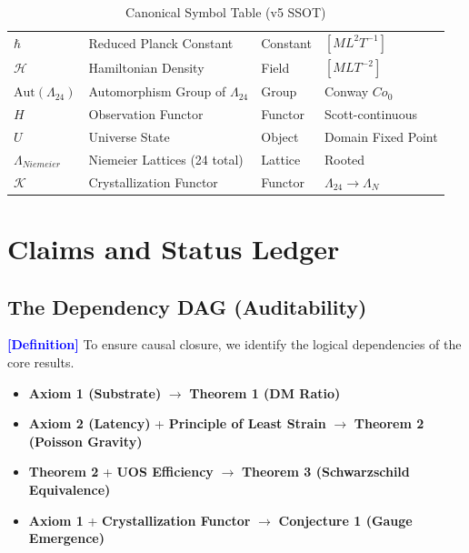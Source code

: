 \documentclass[11pt,titlepage]{article}
\newcommand{\leech}{\Lambda_{24}}
\newcommand{\tagdef}{\textcolor{blue}{\textbf{[Definition]}} }
\begin{document}
\begin{table}[h!]
\begin{tabular}{@{}llll@{}}
$\hbar$ & Reduced Planck Constant & Constant & $[M L^2 T^{-1}]$ \\
$\mathcal{H}$ & Hamiltonian Density & Field & $[M L T^{-2}]$ \\
$\text{Aut}(\leech)$ & Automorphism Group of $\leech$ & Group & Conway $Co_0$ \\
$H$ & Observation Functor & Functor & Scott-continuous \\
$U$ & Universe State & Object & Domain Fixed Point \\
$\Lambda_{Niemeier}$ & Niemeier Lattices (24 total) & Lattice & Rooted \\
$\mathcal{K}$ & Crystallization Functor & Functor & $\leech \to \Lambda_N$ \\ \bottomrule
\end{tabular}
\caption{Canonical Symbol Table (v5 SSOT)}
\end{table}

\newpage
\tableofcontents
\newpage

\section{Claims and Status Ledger}
\subsection{The Dependency DAG (Auditability)}
\tagdef To ensure causal closure, we identify the logical dependencies of the core results.
\begin{itemize}
    \item \textbf{Axiom 1 (Substrate)} $\to$ \textbf{Theorem 1 (DM Ratio)}
    \item \textbf{Axiom 2 (Latency)} + \textbf{Principle of Least Strain} $\to$ \textbf{Theorem 2 (Poisson Gravity)}
    \item \textbf{Theorem 2} + \textbf{UOS Efficiency} $\to$ \textbf{Theorem 3 (Schwarzschild Equivalence)}
    \item \textbf{Axiom 1} + \textbf{Crystallization Functor} $\to$ \textbf{Conjecture 1 (Gauge Emergence)}
\end{itemize}
\end{document}
